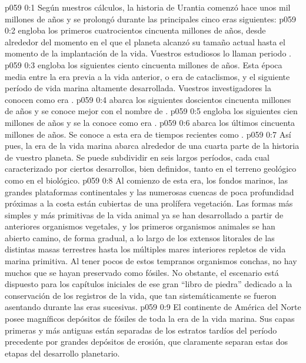 \author{Portador de vida}
\vs p059 0:1 Según nuestros cálculos, la historia de Urantia comenzó hace unos mil millones de años y se prolongó durante las principales cinco eras siguientes:
\vs p059 0:2  engloba los primeros cuatrocientos cincuenta millones de años, desde alrededor del momento en el que el planeta alcanzó su tamaño actual hasta el momento de la implantación de la vida. Vuestros estudiosos lo llaman periodo .
\vs p059 0:3  engloba los siguientes ciento cincuenta millones de años. Esta época media entre la era previa a la vida anterior, o era de cataclismos, y el siguiente período de vida marina altamente desarrollada. Vuestros investigadores la conocen como era .
\vs p059 0:4  abarca los siguientes doscientos cincuenta millones de años y se conoce mejor con el nombre de .
\vs p059 0:5  engloba los siguientes cien millones de años y se la conoce como era .
\vs p059 0:6  abarca los últimos cincuenta millones de años. Se conoce a esta era de tiempos recientes como .
\vs p059 0:7 \pc Así pues, la era de la vida marina abarca alrededor de una cuarta parte de la historia de vuestro planeta. Se puede subdividir en seis largos períodos, cada cual caracterizado por ciertos desarrollos, bien definidos, tanto en el terreno geológico como en el biológico.
\vs p059 0:8 Al comienzo de esta era, los fondos marinos, las grandes plataformas continentales y las numerosas cuencas de poca profundidad próximas a la costa están cubiertas de una prolífera vegetación. Las formas más simples y más primitivas de la vida animal ya se han desarrollado a partir de anteriores organismos vegetales, y los primeros organismos animales se han abierto camino, de forma gradual, a lo largo de los extensos litorales de las distintas masas terrestres hasta los múltiples mares interiores repletos de vida marina primitiva. Al tener pocos de estos tempranos organismos conchas, no hay muchos que se hayan preservado como fósiles. No obstante, el escenario está dispuesto para los capítulos iniciales de ese gran “libro de piedra” dedicado a la conservación de los registros de la vida, que tan sistemáticamente se fueron asentando durante las eras sucesivas.
\vs p059 0:9 El continente de América del Norte posee magníficos depósitos de fósiles de toda la era de la vida marina. Sus capas primeras y más antiguas están separadas de los estratos tardíos del período precedente por grandes depósitos de erosión, que claramente separan estas dos etapas del desarrollo planetario.
